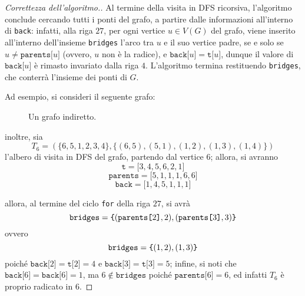 \documentclass[a4paper, 12pt]{report}
\begin{document}
\begin{proof}[Correttezza dell'algoritmo.]
        Al termine della visita in DFS ricorsiva, l'algoritmo conclude cercando tutti i ponti del grafo, a partire dalle informazioni all'interno di \texttt{back}: infatti, alla riga $27$, per ogni vertice $u \in V(G)$ del grafo, viene inserito all'interno dell'insieme \texttt{bridges} l'arco tra $u$ e il suo vertice padre, se e solo se $u \neq \texttt{parents[}u\texttt{]}$ (ovvero, $u$ non è la radice), e $\texttt{back[}u\texttt{]} = \texttt{t[}u\texttt{]}$, dunque il valore di $\texttt{back[}u\texttt{]}$ è rimasto invariato dalla riga $4$. L'algoritmo termina restituendo \texttt{bridges}, che conterrà l'insieme dei ponti di $G$.

        Ad esempio, si consideri il seguente grafo:

        \begin{figure}[H]
            \centering
            \caption{Un grafo indiretto.}
        \end{figure}

        inoltre, sia $$T_6 = (\{6, 5, 1, 2, 3, 4\}, \{(6, 5), (5, 1), (1, 2), (1, 3), (1, 4)\})$$ l'albero di visita in DFS del grafo, partendo dal vertice $6$; allora, si avranno $$\texttt{t} = \texttt{[}3, 4, 5, 6, 2, 1\texttt{]}$$ $$\texttt{parents} = \texttt{[}5, 1, 1, 1, 6, 6\texttt{]}$$ $$\texttt{back} = \texttt{[}1, 4, 5, 1, 1, 1\texttt{]}$$

        allora, al termine del ciclo \texttt{for} della riga $27$, si avrà $$\texttt{bridges} = \verb|{| (\texttt{parents[}2\texttt{]}, 2), (\texttt{parents[}3\texttt{]}, 3)\verb|}|$$ ovvero $$\texttt{bridges} = \verb|{| (1, 2), (1, 3)\verb|}|$$ poiché $\texttt{back[}2\texttt{]} = \texttt{t[}2\texttt{]} = 4$ e $\texttt{back[}3\texttt{]} = \texttt{t[}3\texttt{]} = 5$; infine, si noti che $\texttt{back[}6\texttt{]} = \texttt{back[}6\texttt{]} = 1$, ma $6 \notin \texttt{bridges}$ poiché $\texttt{parents[}6\texttt{]} = 6$, ed infatti $T_6$ è proprio radicato in $6$.
    \end{proof}
\end{document}
